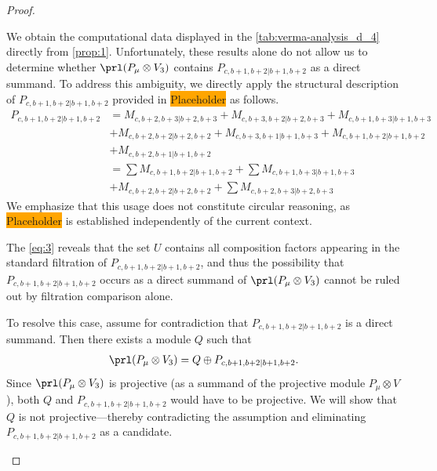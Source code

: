 \begin{proof}
\begin{enumerate}
\begin{enumerate}
We obtain the computational data displayed in the \cref{tab:verma-analysis_d_4} directly from \cref{prop:1}. 
Unfortunately, these results alone do not allow us to determine whether $\prl(P_\mu \otimes V_3)$ contains $P_{c,b+1,b+2|b+1,b+2}$ as a direct summand. To address this ambiguity, we directly apply the structural description of $P_{c,b+1,b+2|b+1,b+2}$ provided in \colorbox{orange}{Placeholder} as follows.
\begin{equation}\label{eq:3}
  \begin{aligned}
    P_{c,b+1,b+2|b+1,b+2} &=
M_{c,b+2,b+3|b+2,b+3}
+M_{c,b+3,b+2|b+2,b+3}
+M_{c,b+1,b+3|b+1,b+3}\\
                                              &
+M_{c,b+2,b+2|b+2,b+2}
+M_{c,b+3,b+1|b+1,b+3}
+M_{c,b+1,b+2|b+1,b+2}\\
                                              &
+M_{c,b+2,b+1|b+1,b+2}\\
                          &=
\sum M_{c,b+1,b+2|b+1,b+2}
+\sum M_{c,b+1,b+3|b+1,b+3}\\
                                              &
+ M_{c,b+2,b+2|b+2,b+2}
+\sum M_{c,b+2,b+3|b+2,b+3}
  \end{aligned}
\end{equation}
We emphasize that this usage does not constitute circular reasoning, as \colorbox{orange}{Placeholder} is established independently of the current context.

The \cref{eq:3} reveals that the set $U$ contains all composition factors appearing in the standard filtration of $P_{c,b+1,b+2|b+1,b+2}$, and thus the possibility that $P_{c,b+1,b+2|b+1,b+2}$ occurs as a direct summand of $\prl(P_\mu \otimes V_3)$ cannot be ruled out by filtration comparison alone.

To resolve this case, assume for contradiction that $P_{c,b+1,b+2|b+1,b+2}$ is a direct summand. Then there exists a module $Q$ such that
\begin{equation}\notag
  \begin{aligned}
    \prl(P_\mu \otimes V_3) = Q \oplus P_{c,b+1,b+2|b+1,b+2}.
  \end{aligned}
\end{equation}
Since $\prl(P_\mu \otimes V_3)$ is projective (as a summand of the projective module $P_\mu \otimes V$), both $Q$ and $P_{c,b+1,b+2|b+1,b+2}$ would have to be projective. We will show that $Q$ is not projective—thereby contradicting the assumption and eliminating $P_{c,b+1,b+2|b+1,b+2}$ as a candidate.


\end{enumerate}
\end{enumerate}
\end{proof}
